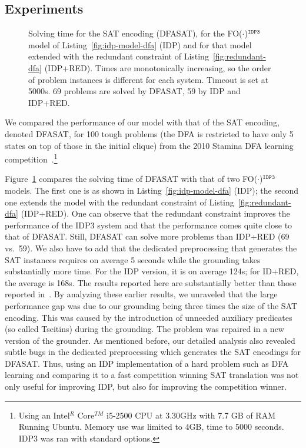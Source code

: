 \documentclass{tlp}
\newcommand{\idp}{{\sc IDP}\xspace}
\newcommand{\idpdrie}{{\sc IDP3}\xspace}
\newcommand{\fodotidp}{{\sc FO($\cdot$)$^{\mathtt{IDP3}}$}\xspace}
\renewcommand{\|}{\ensuremath{\,|\,}}
\renewcommand{\|}{\,|\,}
\begin{document}
\subsection{Experiments}



\begin{figure}[t]
\begin{center}
\caption{Solving time for the SAT encoding (DFASAT), for the \fodotidp model
  of Listing~\ref{fig:idp-model-dfa} (IDP) and for that model extended
  with the redundant constraint of Listing~\ref{fig:redundant-dfa}
  (IDP+RED). Times are monotonically increasing, so the order of
  problem instances is different for each system. Timeout is set at
  5000s. 69 problems are solved by DFASAT, 59 by IDP and IDP+RED.}
\label{fig:solvingtime}
\end{center}
\end{figure}




We compared the performance of our model with that of the SAT encoding, denoted DFASAT, for 100 tough problems (the DFA is restricted to have only 5 states on top of those in the initial clique) from the 2010 Stamina DFA learning competition~\cite{stamina}.\footnote{Using an Intel$^R$ Core$^{TM}$ i5-2500 CPU at 3.30GHz with 7.7 GB of RAM Running Ubuntu. Memory use was limited to 4GB, time to 5000 seconds. \idpdrie was ran with standard options.} %

Figure~\ref{fig:solvingtime} compares the solving time of DFASAT with
that of two \fodotidp models. The first one is as shown in
Listing~\ref{fig:idp-model-dfa} (IDP); the second one extends the
model with the redundant constraint of Listing~\ref{fig:redundant-dfa}
(IDP+RED). One can observe that the redundant constraint improves the
performance of the \idpdrie system and that the performance comes
quite close to that of DFASAT. Still, DFASAT can solve more problems
than IDP+RED (69 vs.\ 59).  We also have to add that the
dedicated preprocessing that generates the SAT instances requires on
average 5 seconds while the grounding takes substantially more
time. For the IDP version, it is on average 124s; for ID+RED, the
average is 168s.
%
The results reported here are substantially better than those reported
in~\cite{iclp/Blockeeletall12}. By analyzing these earlier results, we
unraveled that the large performance gap was due to our grounding
being three times the size of the SAT encoding. This was caused by the
introduction of unneeded auxiliary predicates (so called Tseitins)
during the grounding. The problem was repaired in a new version of the
grounder. As mentioned before, our detailed
analysis also revealed subtle bugs in the dedicated preprocessing 
which generates the SAT encodings for DFASAT.
Thus, using an \idp implementation of a hard problem such as DFA
learning and comparing it to a fast competition winning SAT translation
was not only useful for improving \idp, but also for improving the 
competition winner. 
\end{document}
